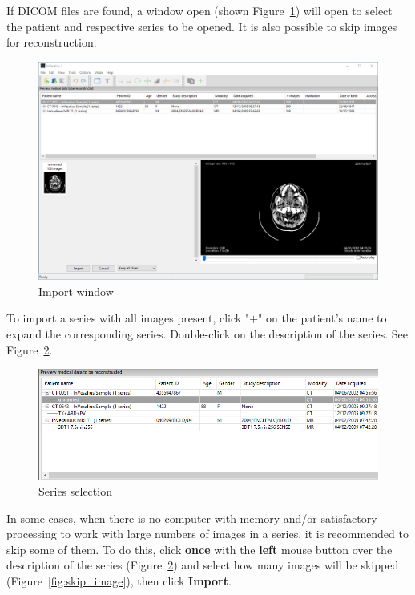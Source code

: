 \newpage

If DICOM files are found, a window open (shown Figure~\ref{fig:win_import}) will open to select the patient and respective series to be opened. It is also possible to skip images for reconstruction.

\begin{figure}[!htb]
\centering
\includegraphics[scale=0.4]{../user_guide_figures/invesalius_screen/import_window_en.png}
\caption{Import window}
\label{fig:win_import}
\end{figure}

\newpage

To import a series with all images present, click "\textbf{$+$}" on the patient’s name to expand the corresponding series. Double-click on the description of the series. See Figure~\ref{fig:import_serie}.

\begin{figure}[!htb]
\centering
\includegraphics[scale=0.5]{../user_guide_figures/invesalius_screen/import_window_detail_en.png}
\caption{Series selection}
\label{fig:import_serie}
\end{figure}

In some cases, when there is no computer with memory and/or satisfactory processing to work with large numbers of images in a series, it is recommended to skip some of them. To do this, click \textbf{once} with the \textbf{left} mouse button over the description of the series (Figure~\ref{fig:import_serie}) and select how many images will be skipped (Figure~\ref{fig:skip_image}), then click \textbf{Import}.

